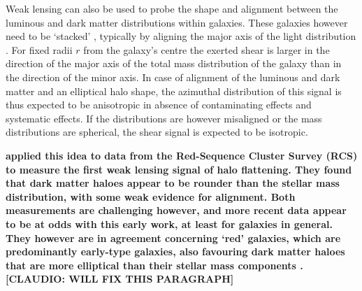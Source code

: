 \documentclass[useAMS,usenatbib]{mn2e}
\begin{document}
Weak lensing can also be used to probe the shape and alignment between the luminous and dark matter distributions within galaxies. These galaxies however need to be `stacked' \citep{2000astro.ph..6281B,2000ApJ...538L.113N}, typically by aligning the major axis of the light distribution \citep[e.g.][]{2004ApJ...606...67H}. For fixed radii $r$ from the galaxy's centre the exerted shear is larger in the direction of the major axis of the total mass distribution of the galaxy than in the direction of the minor axis. In case of alignment of the luminous and dark matter and an elliptical halo shape, the azimuthal distribution of this signal is thus expected to be anisotropic in absence of contaminating effects \citep[e.g. shape-shear intrinsic alignments (\textit{GI}-term);][]{2004PhRvD..70f3526H} and systematic effects. If the distributions are however misaligned or the mass distributions are spherical, the shear signal is expected to be isotropic.

\textbf{\citet{2004ApJ...606...67H} applied this idea to data from the Red-Sequence Cluster Survey (RCS) to measure the first weak lensing signal of halo flattening. They found that dark matter haloes appear to be rounder than the stellar mass distribution, with some weak evidence for alignment. Both measurements are challenging however, and more recent data appear to be at odds with this early work, at least for galaxies in general. They however are in agreement concerning `red' galaxies, which are predominantly early-type galaxies, also favouring dark matter haloes that are more elliptical than their stellar mass components \citep{2006MNRAS.370.1008M,2007ApJ...669...21P,2012A&A...545A..71V}. \citet{2015arXiv150603536C} \citet{2015arXiv150704301S} [CLAUDIO: WILL FIX THIS PARAGRAPH]}

\end{document}
